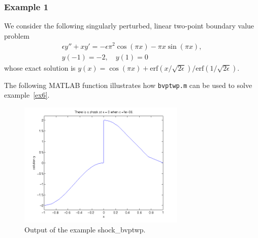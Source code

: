 \documentclass{article}
\begin{document}
\subsubsection{Example 1}
We consider the following singularly perturbed, linear two-point boundary
value problem
\begin{equation}\label{ex6}
\begin{array}{l} \epsilon y'' + x y' = -\epsilon \pi^2 \cos(\pi x) - \pi x \sin(\pi x), \\
y(-1) = -2,\quad y(1)=0\end{array}
\end{equation}
whose exact solution is
$y(x)=\cos(\pi x) +\mbox{erf}(x/\sqrt{2\epsilon})/\mbox{erf}(1/\sqrt{2
\epsilon})$.

The following MATLAB function illustrates how \texttt{bvptwp.m} can be
used to solve example~\eqref{ex6}.

\begin{figure}[t]
\centerline{\includegraphics[height=6cm]{shock_bvptwp}}
\caption{Output of the example shock\_bvptwp.}
\end{figure}

\lstset{language=MATLAB}
\lstset{commentstyle=\textit,basicstyle=\small}
\end{document}
